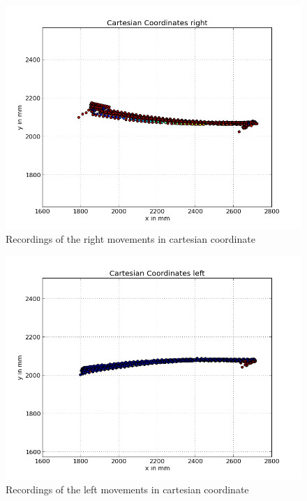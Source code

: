 \documentclass{scrartcl}
\begin{document}
\begin{figure}[H]
\centering
\begin{minipage}{.5\textwidth}
  \centering
  \includegraphics[width=1\linewidth]{img_second_run/Cartesian_right.png}
\end{minipage}%

\caption{Recordings of the right movements in cartesian coordinate}
\label{fig:outliers}
\end{figure}


\begin{figure}[H]
\centering
\begin{minipage}{.5\textwidth}
  \centering
  \includegraphics[width=1\linewidth]{img_second_run/Cartesian_left.png}
\end{minipage}%

\caption{Recordings of the left movements in cartesian coordinate}
\label{fig:outliers}
\end{figure}
\end{document}
